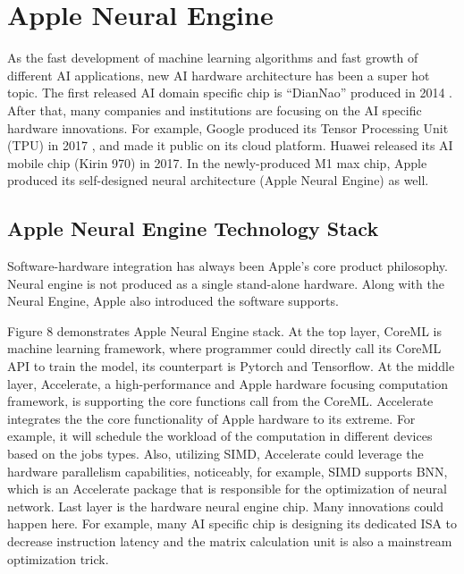\documentclass[11pt]{article}
\begin{document}
\newpage
\section{Apple Neural Engine}
As the fast development of machine learning algorithms and fast growth of different AI applications, new AI hardware architecture has been a super hot topic. The first released AI domain specific chip is “DianNao” produced in 2014 \cite{diannao}. After that, many companies and institutions are focusing on the AI specific hardware innovations. For example, Google produced its Tensor Processing Unit (TPU) in 2017 \cite{diannao}, and made it public on its cloud platform. Huawei released its AI mobile chip (Kirin 970) in 2017. In the newly-produced M1 max chip, Apple produced its self-designed neural architecture (Apple Neural Engine) as well.

\subsection*{Apple Neural Engine Technology Stack}
Software-hardware integration has always been Apple’s core product philosophy. Neural engine is not produced as a single stand-alone hardware. Along with the Neural Engine, Apple also introduced the software supports.

Figure 8 demonstrates Apple Neural Engine stack. At the top layer, CoreML is machine learning framework, where programmer could directly call its CoreML API to train the model, its counterpart is Pytorch and Tensorflow. At the middle layer, Accelerate, a high-performance and Apple hardware focusing computation framework, is supporting the core functions call from the CoreML. Accelerate integrates the the core functionality of Apple hardware to its extreme. For example, it will schedule the workload of the computation in different devices based on the jobs types. Also, utilizing SIMD, Accelerate could leverage the hardware parallelism capabilities, noticeably, for example, SIMD supports BNN, which is an Accelerate package that is responsible for the optimization of neural network. Last layer is the hardware neural engine chip. Many innovations could happen here. For example, many AI specific chip is designing its dedicated ISA to decrease instruction latency and the matrix calculation unit is also a mainstream optimization trick.
\end{document}
